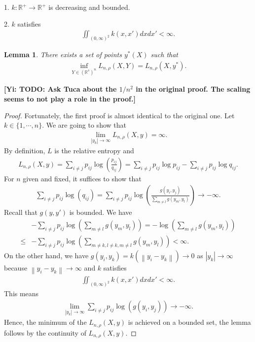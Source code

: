 \documentclass[10pt]{article}
\newcommand{\norm}[1]{\left\lVert#1\right\rVert}
\newcommand{\gy}[1]{\textbf{\color{gred}[Yi: #1]}}
\newtheorem{lemma}{\bf Lemma}
\newenvironment{Proof of lemma}{\noindent{\bf Proof of Lemma}}{\hfill$\Box$\newline}
\newenvironment{Proof of claim}{\noindent{\bf Proof of claim}}{\hfill$\Box$\newline}
\newenvironment{Proof of theorem}{\noindent{\bf Proof of Theorem}}{\hfill\scriptsize{$\Box$}\newline}
\newenvironment{Proof of theorems}{\noindent{\bf Proof of Theorems}}{\hfill$\Box$\newline}
\newenvironment{Proof of proposition}{\noindent{\bf Proof of Proposition}}{\hfill$\Box$\newline}
\newenvironment{Proof of propositions}{\noindent{\bf Proof of Propositions}}{\hfill$\Box$\newline}
\newenvironment{Proof of exercise}{\noindent{\it Proof of Exercise:}}{\hfill$\Box$}
\numberwithin{equation}{section}
\begin{document}
1. $k: \mathbb{R}^+ \to \mathbb{R}^+$ is decreasing and bounded.

2. $k$ satisfies
\begin{align}
    \iint_{(0,\infty)^2} k(x,x') dxdx' < \infty.
\end{align}

\begin{lemma} \label{lower_bound_lemma_1}
    There exists a set of points $y^*(X)$ such that
    \begin{align}
        \inf_{Y \in (\mathbb{R}^s)^n}L_{n,\rho}(X,Y) = L_{n,\rho}(X,y^*).
    \end{align}
\end{lemma}
\gy{TODO: Ask Tuca about the $1/n^2$ in the original proof. The scaling seems to not play a role in the proof.}
\begin{proof}
    Fortunately, the first proof is almost identical to the original one. Let $k \in \{1,\cdots, n\}$. We are going to show that
    \begin{align}
        \lim_{|y_k| \to \infty} L_{n,\rho}(X,y) = \infty.
    \end{align}
    By definition, $L$ is the relative entropy and
    \begin{align}
        L_{n,\rho}(X,y) = \sum_{i \neq j} p_{ij}\log \left(\frac{p_{ij}}{q_{ij}}\right) = \sum_{i \neq j} p_{ij}\log p_{ij} - \sum_{i \neq j} p_{ij}\log q_{ij}.
    \end{align}
    For $n$ given and fixed, it suffices to show that
    \begin{align}
        \sum_{i \neq j} p_{ij}\log (q_{ij}) = \sum_{i \neq j} p_{ij}\log \left(\frac{g(y_i,y_j)}{\sum_{m \neq l}g(y_m,y_l)}\right) \to -\infty.
    \end{align}
    Recall that $g(y,y')$ is bounded. We have
    \begin{align}
             & -\sum_{i \neq j} p_{ij} \log \left(\sum_{m \neq l}g(y_m,y_l) \right) = -\log \left(\sum_{m \neq l}g(y_m,y_l) \right) \nonumber \\
        \leq & -\sum_{i \neq j} p_{ij} \log \left(\sum_{m\neq k, l \neq k, m \neq l}g(y_m,y_l) \right) < \infty.
    \end{align}
    On the other hand, we have $g(y_i,y_k) = k (\norm{y_i-y_k}) \to 0$ as $|y_k| \to \infty$ because $\norm{y_i-y_k} \to \infty$ and $k$ satisfies
    \begin{align}
        \iint_{(0,\infty)^2} k(x,x') dxdx' < \infty.
    \end{align}
    This means
    \begin{align}
        \lim_{|y_k| \to \infty}\sum_{i \neq j} p_{ij} \log (g(y_i,y_j)) \to -\infty.
    \end{align}
    Hence, the minimum of the $L_{n,\rho}(X,y)$ is achieved on a bounded set, the lemma follows by the continuity of $L_{n,\rho}(X,y)$.
\end{proof}
\end{document}
